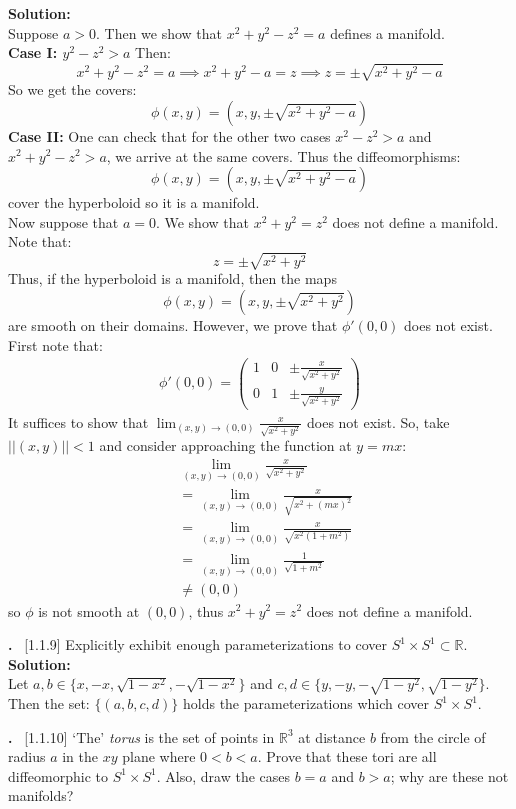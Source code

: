 \documentclass{article}
\newcounter{problem}
\newcounter{solution}
\newcommand\Problem{%
  \stepcounter{problem}%
  \textbf{\theproblem.}~%
  \setcounter{solution}{0}%
}
\newcommand\TheSolution{%
  \textbf{Solution:}\\%
}
\begin{document}
\TheSolution Suppose $a>0$. Then we show that $x^2+y^2-z^2=a$ %
defines a manifold.\\
\textbf{Case I: $y^2-z^2>a$} Then:
\[x^2+y^2-z^2=a \implies x^2+y^2-a=z \implies z=\pm\sqrt{x^2+y^2-a}\]
So we get the covers:
\[\phi(x,y) = (x,y,\pm\sqrt{x^2+y^2-a})\]
\textbf{Case II:}
One can check that for the other two cases $x^2-z^2>a$ and $x^2+y^2-z^2>a$,
we arrive at the same covers. Thus the diffeomorphisms:
\[\phi(x,y)=(x,y,\pm\sqrt{x^2+y^2-a})\]
cover the hyperboloid so it is a manifold.\\
Now suppose that $a=0$. We show that $x^2+y^2=z^2$ does not define %
a manifold. Note that:
\[z=\pm\sqrt{x^2+y^2}\]
Thus, if the hyperboloid is a manifold, then the maps
\[\phi(x,y)=(x,y,\pm\sqrt{x^2+y^2})\]
are smooth on their domains. However, we prove that $\phi'(0,0)$ %
does not exist. First note that:
\begin{align*}
    \phi'(0,0)=\begin{pmatrix}
        1 & 0 & \pm\frac{x}{\sqrt{x^2+y^2}} \\
        0 & 1 & \pm\frac{y}{\sqrt{x^2+y^2}}
    \end{pmatrix}
\end{align*}
It suffices to show that $\lim_{(x,y)\to(0,0)} \frac{x}{\sqrt{x^2+y^2}}$ %
does not exist. So, take $||(x,y)||<1$ and consider approaching the %
function at $y=mx$:
\begin{align*}
    &\lim_{(x,y)\to(0,0)}\frac{x}{\sqrt{x^2+y^2}} \\
    &= \lim_{(x,y)\to(0,0)}\frac{x}{\sqrt{x^2+(mx)^2}} \\
    &= \lim_{(x,y)\to(0,0)}\frac{x}{\sqrt{x^2(1+m^2)}} \\
    &= \lim_{(x,y)\to(0,0)} \frac{1}{\sqrt{1+m^2}} \\
    &\neq (0,0)
\end{align*}
so $\phi$ is not smooth at $(0,0)$, thus $x^2+y^2=z^2$ does not %
define a manifold.

\Problem[1.1.9] Explicitly exhibit enough parameterizations to cover %
$S^1\times S^1 \subset \mathbb{R}$.
\TheSolution Let $a,b \in \{x,-x,\sqrt{1-x^2},-\sqrt{1-x^2}\}$ and %
$c,d\in \{y,-y,-\sqrt{1-y^2},\sqrt{1-y^2}\}$.
Then the set:
$\{(a,b,c,d)\}$ holds the parameterizations which cover $S^1\times S^1$.

\Problem[1.1.10] ‘The’ \textit{torus} is the set of points in $\mathbb{R}^3$ %
at distance $b$ from the circle of radius $a$ in the $xy$ plane where %
$0<b<a$. Prove that these tori are all diffeomorphic to $S^1\times S^1$.
Also, draw the cases $b=a$ and $b>a$; why are these not manifolds?
\end{document}
